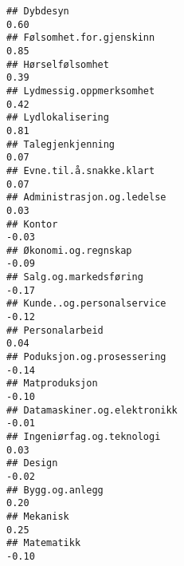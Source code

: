 \documentclass[
]{article}
\begin{document}
\begin{verbatim}
## Dybdesyn                                                                          0.60
## Følsomhet.for.gjenskinn                                                           0.85
## Hørselfølsomhet                                                                   0.39
## Lydmessig.oppmerksomhet                                                           0.42
## Lydlokalisering                                                                   0.81
## Talegjenkjenning                                                                  0.07
## Evne.til.å.snakke.klart                                                           0.07
## Administrasjon.og.ledelse                                                         0.03
## Kontor                                                                           -0.03
## Økonomi.og.regnskap                                                              -0.09
## Salg.og.markedsføring                                                            -0.17
## Kunde..og.personalservice                                                        -0.12
## Personalarbeid                                                                    0.04
## Poduksjon.og.prosessering                                                        -0.14
## Matproduksjon                                                                    -0.10
## Datamaskiner.og.elektronikk                                                      -0.01
## Ingeniørfag.og.teknologi                                                          0.03
## Design                                                                           -0.02
## Bygg.og.anlegg                                                                    0.20
## Mekanisk                                                                          0.25
## Matematikk                                                                       -0.10
## Fysikk                                                                            0.03
## Kjemi                                                                            -0.19
## Biologi                                                                          -0.26
## Psykologi                                                                        -0.07
## Sosiologi.og.sosialantropologi                                                   -0.08
## Geografi                                                                          0.52
## Medisin.og.odontologi                                                            -0.28
## Terapi.og.rådgiving                                                              -0.16

\end{verbatim}
\end{document}
